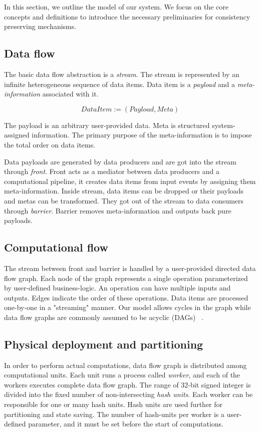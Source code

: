 
\label {fs-model-section}

In this section, we outline the model of our system. We focus on the core concepts and definitions to introduce the necessary preliminaries for consistency preserving mechanisms.

\subsection{Data flow}
The basic data flow abstraction is a {\it stream}. The stream is represented by an infinite heterogeneous sequence of data items. Data item is a {\it payload} and a {\it meta-information} associated with it. 

\[DataItem := (Payload, Meta)\]

The payload is an arbitrary user-provided data. Meta is structured system-assigned information. The primary purpose of the meta-information is to impose the total order on data items. 

Data payloads are generated by data producers and are got into the stream through {\it front}. Front acts as a mediator between data producers and a computational pipeline, it creates data items from input events by assigning them meta-information. Inside stream, data items can be dropped or their payloads and metas can be transformed. They got out of the stream to data consumers through {\it barrier}. Barrier removes meta-information and outputs back pure payloads.

\subsection{Computational flow}
The stream between front and barrier is handled by a user-provided directed data flow graph. Each node of the graph represents a single operation parameterized by user-defined business-logic. An operation can have multiple inputs and outputs. Edges indicate the order of these operations. Data items are processed one-by-one in a "streaming" manner. Our model allows cycles in the graph while data flow graphs are commonly assumed to be acyclic (DAGs) 
~\cite{Zaharia:2016:ASU:3013530.2934664, Carbone:2017:SMA:3137765.3137777}.

\subsection{Physical deployment and partitioning}
In order to perform actual computations, data flow graph is distributed among computational units. Each unit runs a process called {\it worker}, and each of the workers executes complete data flow graph. The range of 32-bit signed integer is divided into the fixed number of non-intersecting {\it hash units}. Each worker can be responsible for one or many hash units. Hash units are used further for partitioning and state saving. The number of hash-units per worker is a user-defined parameter, and it must be set before the start of computations. 


